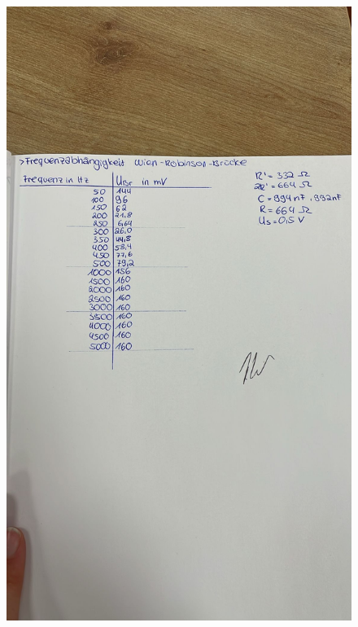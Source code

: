 \begin{figure}
    \centering
    \includegraphics[width=\textwidth]{Messdaten/Daten1.jpg}
\end{figure}